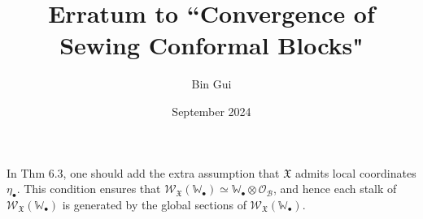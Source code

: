 \documentclass[11pt,b5paper,notitlepage]{article}
\title{Erratum to ``Convergence of Sewing Conformal Blocks"}
\author{Bin Gui}
\date{September 2024}
\begin{document}
\maketitle

In Thm 6.3, one should add the extra assumption that $\mathfrak X$ admits local coordinates $\eta_\bullet$. This condition ensures that $\mathscr W_{\mathfrak X}(\mathbb W_\bullet)\simeq \mathbb W_\bullet\otimes\mathscr O_{\mathcal B}$, and hence each stalk of $\mathscr W_{\mathfrak X}(\mathbb W_\bullet)$ is generated by the global sections of $\mathscr W_{\mathfrak X}(\mathbb W_\bullet)$.
\end{document}
